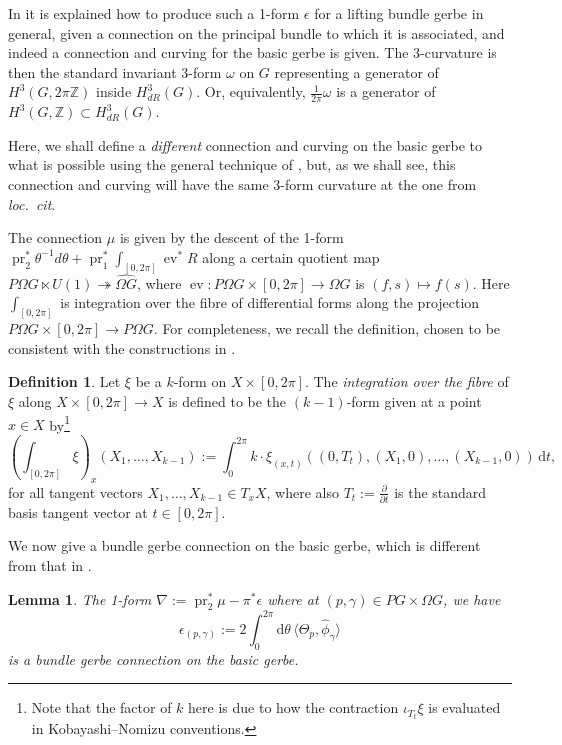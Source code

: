 \documentclass[12pt]{amsart}
\DeclareMathOperator{\pr}{pr}
\DeclareMathOperator{\ev}{ev}
\theoremstyle{plain}
\newtheorem{lemma}[theorem]{Lemma}
\theoremstyle{definition}
\newtheorem{definition}[theorem]{Definition}
\theoremstyle{remark}
\numberwithin{equation}{section}
\newcommand{\ZZ}{{\mathbb Z}}
\newcommand{\<}{\langle}
\renewcommand{\>}{\rangle}
\newcommand{\intSone}{\int_{0}^{2\pi}\mathrm{d}\theta\,}
\newcommand{\Omegahat}[1]{\widehat{\Omega #1}}
\newcommand{\phihat}{\widehat{\phi}}
\begin{document}
In \cite{MS03} it is explained how to produce such a 1-form $\epsilon$ for a lifting bundle gerbe in general, given a connection on the principal bundle to which it is associated, and indeed a connection and curving for the basic gerbe is given. 
The 3-curvature is then the standard invariant 3-form $\omega$ on $G$ representing a generator of $H^3(G,2\pi\ZZ)$ inside $H^3_{dR}(G)$. Or, equivalently, $\frac{1}{2\pi}\omega$ is a generator of $H^3(G,\ZZ)\subset H^3_{dR}(G)$.

Here, we shall define a \emph{different} connection and curving on the basic gerbe to what is possible using the general technique of \cite{MS03}, but, as we shall see, this connection and curving will have the same 3-form curvature at the one from \emph{loc.\ cit}.

\label{form:central extension connection}
The connection $\mu$ is given by the descent of the 1-form $\pr_2^*\theta^{-1}d\theta + \pr_1^*\int_{[0,2\pi]} \ev^* R$ along a certain quotient map $P\Omega G \ltimes U(1) \twoheadrightarrow \Omegahat{G}$, where $\ev\colon P\Omega G \times [0,2\pi] \to \Omega G$ is $(f,s) \mapsto f(s)$. 
Here $\int_{[0,2\pi]}$ is integration over the fibre of differential forms along the projection $P\Omega G \times [0,2\pi] \to P\Omega G$. 
For completeness, we recall the definition, chosen to be consistent with the constructions in \cite{MS03}.

\begin{definition}\label{def:fibre_integration}
Let $\xi$ be a $k$-form on $X\times [0,2\pi]$. The \emph{integration over the fibre} of $\xi$ along $X \times [0,2\pi] \to X$ is defined to be the $(k-1)$-form given at a point $x\in X$ by\footnote{Note that the factor of $k$ here is due to how the contraction $\iota_{T_t}\xi$ is evaluated in Kobayashi--Nomizu conventions.}
\[
  \left(\int_{[0,2\pi]} \xi\right)_{\!x}\!(X_1,\ldots,X_{k-1}) := \int_0^{2\pi}k\cdot \xi_{(x,t)}((0,T_t),(X_1,0),\ldots,(X_{k-1},0))\,\mathrm{d}t, 
\]
for all tangent vectors $X_1,\ldots,X_{k-1}\in T_xX$, where also $T_t:=\frac{\partial}{\partial t}$ is the standard basis tangent vector at $t\in [0,2\pi]$.
\end{definition}

We now give a bundle gerbe connection on the basic gerbe, which is different from that in \cite{MS03}. \label{form:basic gerbe connection} \label{form:basic gerbe connection fix-up form}

\begin{lemma}\label{lemma:connection}
The 1-form $\nabla := \pr_2^*\mu - \pi^*\epsilon$ 
where at $(p,\gamma)\in PG\times \Omega G$, we have
\begin{equation}\label{eq:eps_def}
  \epsilon_{(p,\gamma)} := 2\intSone \langle\Theta_p,\phihat_\gamma\rangle
\end{equation}
is a bundle gerbe connection on the basic gerbe.  
\end{lemma}
\end{document}
